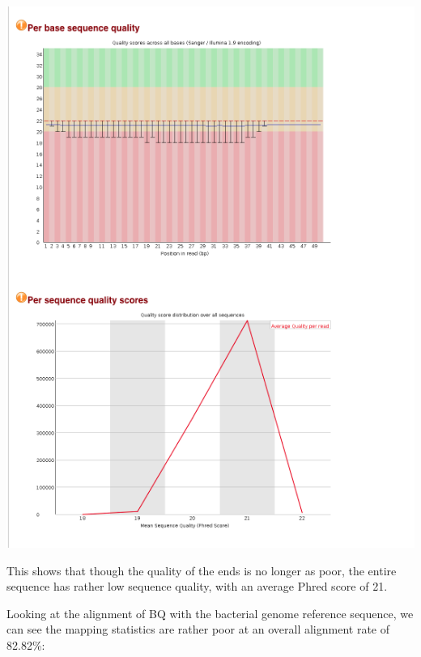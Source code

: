 \documentclass[]{article}
\newenvironment{Shaded}{\begin{snugshade}}{\end{snugshade}}
\newcommand{\FunctionTok}[1]{\textcolor[rgb]{0.00,0.00,0.00}{#1}}
\newcommand{\VariableTok}[1]{\textcolor[rgb]{0.00,0.00,0.00}{#1}}
\newcommand{\OperatorTok}[1]{\textcolor[rgb]{0.81,0.36,0.00}{\textbf{#1}}}
\newcommand{\BuiltInTok}[1]{#1}
\newcommand{\NormalTok}[1]{#1}
\begin{document}
\includegraphics{trimmedns_BQ_fastqc.png}

This shows that though the quality of the ends is no longer as poor, the
entire sequence has rather low sequence quality, with an average Phred
score of 21.

Looking at the alignment of BQ with the bacterial genome reference
sequence, we can see the mapping statistics are rather poor at an
overall alignment rate of 82.82\%:

\begin{Shaded}
\end{Shaded}
\end{document}
